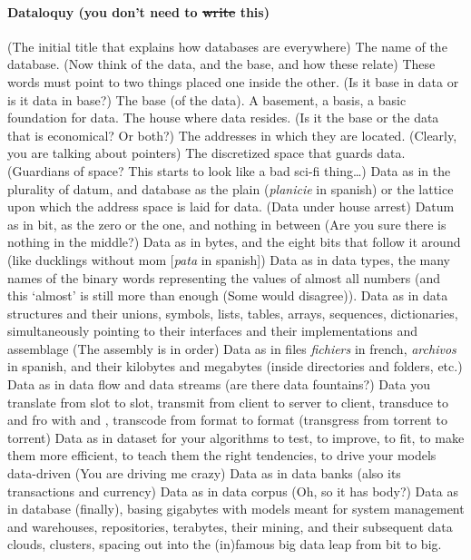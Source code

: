 \paragraph{Dataloquy (you don't need to \sout{write} this)}
(The initial title that explains how databases are everywhere) The name of the database. (Now think of the data, and the base, and how these relate) These words must point to two things placed one inside the other. (Is it base in data or is it data in base?) The base (of the data). A basement, a basis, a basic foundation for data. The house where data resides. (Is it the base or the data that is economical? Or both?) The addresses in which they are located. (Clearly, you are talking about pointers) The discretized space that guards data. (Guardians of space? This starts to look like a bad sci-fi thing\dots) Data as in the plurality of datum, and database as the plain (\textit{planicie} in spanish) or the lattice upon which the address space is laid for data. (Data under house arrest) Datum as in bit, as the zero or the one, and nothing in between (Are you sure there is nothing in the middle?) Data as in bytes, and the eight bits that follow it around (like ducklings without mom [\textit{pata} in spanish]) Data as in data types, the many names of the binary words representing the values of almost all numbers (and this `almost' is still more than enough (Some would disagree)). Data as in data structures and their unions, symbols, lists, tables, arrays, sequences, dictionaries, simultaneously pointing to their interfaces and their implementations and assemblage (The assembly is in order) Data as in files \textit{fichiers} in french, \textit{archivos} in spanish, and their kilobytes and megabytes (inside directories and folders, etc.) Data as in data flow and data streams (are there data fountains?) Data you translate from slot to slot, transmit from client to server to client, transduce to and fro with  and , transcode from format to format (transgress from torrent to torrent) Data as in dataset for your algorithms to test, to improve, to fit, to make them more efficient, to teach them the right tendencies, to drive your models data-driven (You are driving me crazy) Data as in data banks (also its transactions and currency) Data as in data corpus (Oh, so it has body?) Data as in database (finally), basing gigabytes with models meant for system management and warehouses, repositories, terabytes, their mining, and their subsequent data clouds, clusters, spacing out into the (in)famous big data leap from bit to big.



